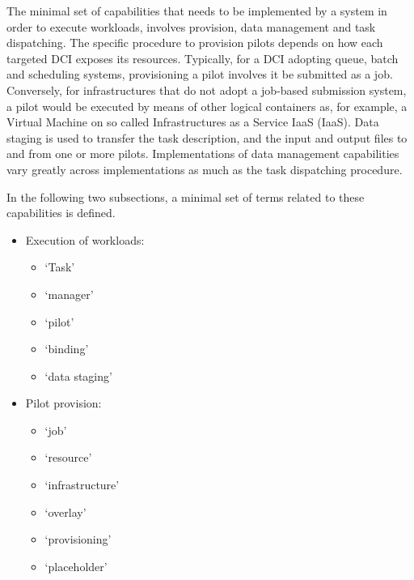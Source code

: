 \documentclass{sig-alternate}
\begin{document}
The minimal set of capabilities that needs to be implemented by a
\pilotjob system in order to execute workloads, involves \pilot
provision, data management and task dispatching. The specific
procedure to provision pilots depends on how each targeted DCI exposes
its resources. Typically, for a DCI adopting queue, batch and
scheduling systems, provisioning a pilot involves it be submitted as a
job. Conversely, for infrastructures that do not adopt a job-based
submission system, a pilot would be executed by means of other logical
containers as, for example, a Virtual Machine on so called
Infrastructures as a Service IaaS (IaaS). Data staging is used to
transfer the task description, and the input and output files to and
from one or more pilots. Implementations of data management
capabilities vary greatly across \pilotjob implementations as much as
the task dispatching procedure.

In the following two subsections, a minimal set of terms related to these 
capabilities is defined. 


\begin{itemize}
  \item Execution of workloads:
  \begin{itemize}
    \item `Task'
    \item `manager'
    \item `pilot'
    \item `binding'
    \item `data staging'
  \end{itemize}
  \item Pilot provision:
  \begin{itemize}
    \item `job'
    \item `resource'
    \item `infrastructure'
    \item `overlay'
    \item `provisioning'
    \item `placeholder'
  \end{itemize}
\end{itemize}
\end{document}
